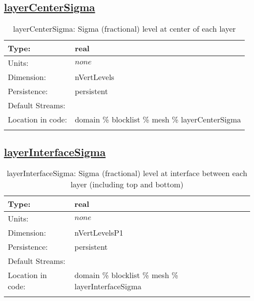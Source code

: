 \subsection[layerCenterSigma]{\hyperref[sec:var_tab_mesh]{layerCenterSigma}}
\label{subsec:var_sec_mesh_layerCenterSigma}
\begin{center}
\begin{longtable}{| p{2.0in} | p{4.0in} |}
        \hline 
        Type: & real \\
        \hline 
        Units: & $none$ \\
        \hline 
        Dimension: & nVertLevels \\
        \hline 
        Persistence: & persistent \\
        \hline 
		 Default Streams: &  \\
        \hline 
		 Location in code: & domain \% blocklist \% mesh \% layerCenterSigma \\
		 \hline 
    \caption{layerCenterSigma: Sigma (fractional) level at center of each layer}
\end{longtable}
\end{center}
\subsection[layerInterfaceSigma]{\hyperref[sec:var_tab_mesh]{layerInterfaceSigma}}
\label{subsec:var_sec_mesh_layerInterfaceSigma}
\begin{center}
\begin{longtable}{| p{2.0in} | p{4.0in} |}
        \hline 
        Type: & real \\
        \hline 
        Units: & $none$ \\
        \hline 
        Dimension: & nVertLevelsP1 \\
        \hline 
        Persistence: & persistent \\
        \hline 
		 Default Streams: &  \\
        \hline 
		 Location in code: & domain \% blocklist \% mesh \% layerInterfaceSigma \\
		 \hline 
    \caption{layerInterfaceSigma: Sigma (fractional) level at interface between each layer (including top and bottom)}
\end{longtable}
\end{center}
